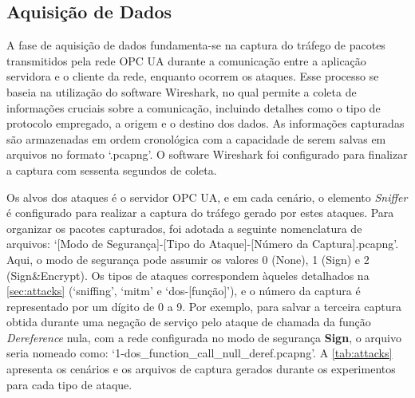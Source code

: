     \subsection{Aquisição de Dados} \label{sec:aquisicao}

    A fase de aquisição de dados fundamenta-se na captura do tráfego de pacotes transmitidos pela rede OPC UA durante a comunicação entre a aplicação servidora e o cliente da rede, enquanto ocorrem os ataques. Esse processo se baseia na utilização do software Wireshark, no qual permite a coleta de informações cruciais sobre a comunicação, incluindo detalhes como o tipo de protocolo empregado, a origem e o destino dos dados. As informações capturadas são armazenadas em ordem cronológica com a capacidade de serem salvas em arquivos no formato `.pcapng'. O software Wireshark foi configurado para finalizar a captura com sessenta segundos de coleta.

    Os alvos dos ataques é o servidor OPC UA, e em cada cenário, o elemento \textit{Sniffer} é configurado para realizar a captura do tráfego gerado por estes ataques. Para organizar os pacotes capturados, foi adotada a seguinte nomenclatura de arquivos: `[Modo de Segurança]-[Tipo do Ataque]-[Número da Captura].pcapng'. Aqui, o modo de segurança pode assumir os valores 0 (None), 1 (Sign) e 2 (Sign\&Encrypt). Os tipos de ataques correspondem àqueles detalhados na \autoref{sec:attacks} (`sniffing', `mitm' e `dos-[função]'), e o número da captura é representado por um dígito de 0 a 9. Por exemplo, para salvar a terceira captura obtida durante uma negação de serviço pelo ataque de chamada da função \textit{Dereference} nula, com a rede configurada no modo de segurança \textbf{Sign}, o arquivo seria nomeado como: `1-dos\_function\_call\_null\_deref.pcapng'. A \autoref{tab:attacks} apresenta os cenários e os arquivos de captura gerados durante os experimentos para cada tipo de ataque.

